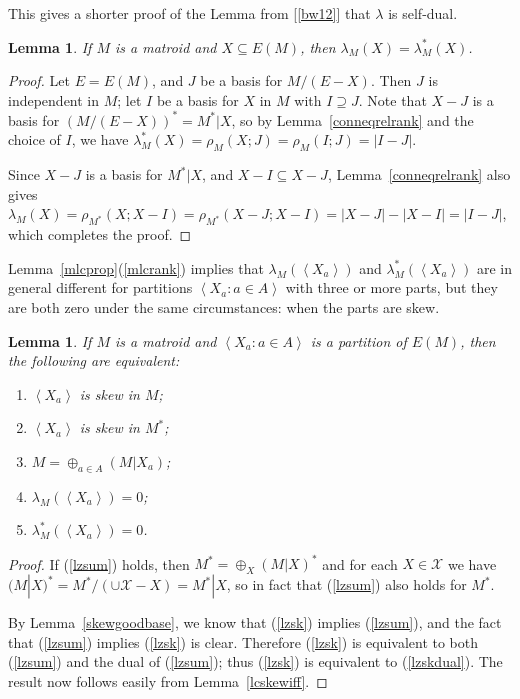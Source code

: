 \documentclass{amsart}
\theoremstyle{plain}
\newtheorem{lemma}[theorem]{Lemma}
\theoremstyle{definition}
\newcommand{\cX}{\mathcal{X}}
\newcommand{\con}{/}
\newcommand{\ab}[1]{\left\langle#1\right\rangle}
\renewcommand{\ss}{\subseteq}
\newcommand{\sps}{\supseteq}
\newcommand{\relrank}[3]{\rho_{#1}({#2};{#3})}
\begin{document}
This gives a shorter proof of the Lemma from [\ref{bw12}] that $\lambda$ is self-dual. 

\begin{lemma}\label{connselfdual}
  If $M$ is a matroid and $X \ss E(M)$, then $\lambda_M(X) = \lambda_M^*(X)$. 
\end{lemma}
\begin{proof}
  Let $E = E(M)$, and $J$ be a basis for $M \con (E-X)$. Then $J$ is independent in $M$; let $I$ be a basis for $X$ in $M$ 
  with $I \sps J$. Note that $X-J$ is a basis for $(M \con (E-X))^* = M^* | X$, so by Lemma~\ref{conneqrelrank} and the choice of $I$, 
  we have $\lambda_M^*(X) = \relrank{M}{X}{J} = \relrank{M}{I}{J} = |I-J|$. 

  Since $X-J$ is a basis for $M^* | X$, and $X-I \ss X- J$, 
  Lemma~\ref{conneqrelrank} also gives $\lambda_M(X) = \relrank{M^*}{X}{X-I} = \relrank{M^*}{X-J}{X-I} = |X-J| - |X-I| = |I-J|$, 
  which completes the proof. 
\end{proof}

Lemma~\ref{mlcprop}(\ref{mlcrank}) implies that
$\lambda_M(\ab{X_a})$ and $\lambda_M^*(\ab{X_a})$ 
are in general different for partitions $\ab{X_a : a \in A}$ with three or more parts, 
but they are both zero under the same circumstances: when the parts are skew. 

\begin{lemma}\label{lambdazero}
  If $M$ is a matroid and $\ab{X_a : a \in A}$ is a partition of $E(M)$, then the following are equivalent:
  \begin{enumerate}[(1)]
    \item\label{lzsk} $\ab{X_a}$ is skew in $M$;
    \item\label{lzskdual} $\ab{X_a}$ is skew in $M^*$;
    \item\label{lzsum} $M = \oplus_{a \in A} (M | X_a)$;
    \item\label{lz} $\lambda_M(\ab{X_a}) = 0$;
    \item\label{lzdual} $\lambda_M^*(\ab{X_a}) = 0$.
  \end{enumerate}
\end{lemma}
\begin{proof}
  If (\ref{lzsum}) holds, then $M^* = \oplus_X(M | X)^*$ and for each $X \in \cX$ we have $(M | X)^* = M^* \con (\cup \cX - X) = M^*|X$, 
  so in fact that (\ref{lzsum}) also holds for $M^*$.
  
  By Lemma~\ref{skewgoodbase}, we know that (\ref{lzsk}) implies (\ref{lzsum}), and the fact that (\ref{lzsum}) implies (\ref{lzsk})
  is clear. Therefore (\ref{lzsk}) is equivalent to both (\ref{lzsum}) 
  and the dual of (\ref{lzsum}); thus (\ref{lzsk}) is equivalent to (\ref{lzskdual}). 
  The result now follows easily from Lemma~\ref{lcskewiff}. 
\end{proof}
\end{document}
